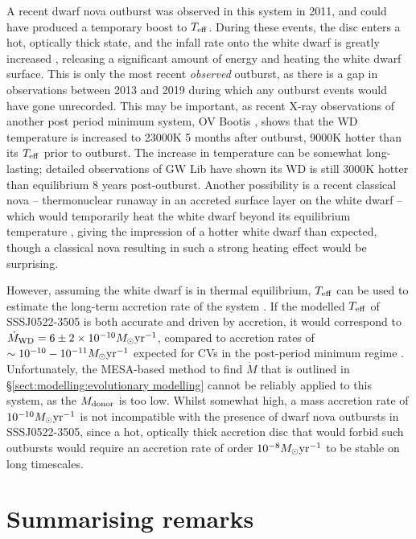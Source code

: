 A recent dwarf nova outburst was observed in this system in 2011, and could have produced a temporary boost to $T_{\rm eff}$. During these events, the disc enters a hot, optically thick state, and the infall rate onto the white dwarf is greatly increased \citep{osaki1996}, releasing a significant amount of energy and heating the white dwarf surface.
This is only the most recent \textit{observed} outburst, as there is a gap in observations between 2013 and 2019 during which any outburst events would have gone unrecorded. This may be important, as recent X-ray observations of another post period minimum system, OV Bootis \citep{Schwope2021}, shows that the WD temperature is increased to 23000K 5 months after outburst, 9000K hotter than its $T_{\rm eff}$ prior to outburst. The increase in temperature can be somewhat long-lasting; detailed observations of GW Lib have shown its WD is still 3000K hotter than equilibrium 8 years post-outburst\citep{Szkody2016}.
Another possibility is a recent classical nova -- thermonuclear runaway in an accreted surface layer on the white dwarf -- which would temporarily heat the white dwarf beyond its equilibrium temperature \citep{starrfield2016}, giving the impression of a hotter white dwarf than expected, though a classical nova resulting in such a strong heating effect would be surprising.

However, assuming the white dwarf is in thermal equilibrium, $T_{\rm eff}$ can be used to estimate the long-term accretion rate of the system \citep{townsley2009}.
If the modelled $T_{\rm eff}$ of SSSJ0522-3505 is both accurate and driven by accretion, it would correspond to $\dot M_{\rm WD} = 6\pm2 \times 10^{-10} M_\odot {\rm yr^{-1}}$, compared to accretion rates of $\sim10^{-10}-10^{-11} M_\odot {\rm yr^{-1}}$ expected for CVs in the post-period minimum regime \citep{Pala2017a}. Unfortunately, the MESA-based method to find $\dot M$ that is outlined in \S\ref{sect:modelling:evolutionary modelling} cannot be reliably applied to this system, as the $M_{\rm donor}$ is too low.
Whilst somewhat high, a mass accretion rate of $10^{-10} M_\odot {\rm yr^{-1}}$ is not incompatible with the presence of dwarf nova outbursts in SSSJ0522-3505, since a hot, optically thick accretion disc that would forbid such outbursts would require an accretion rate of order $10^{-8} M_\odot {\rm yr^{-1}}$ \citep{Hameury1998} to be stable on long timescales.


\section{Summarising remarks}

